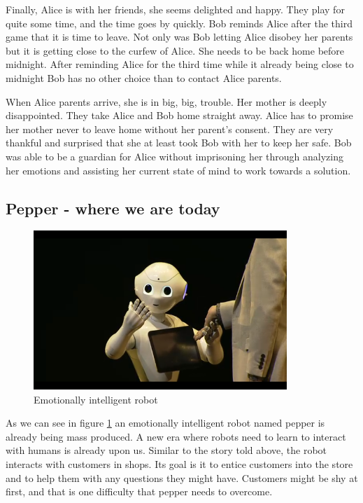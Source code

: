 \documentclass{lncs}
\begin{document}
Finally, Alice is with her friends, she seems delighted and happy. They play for quite some time, and the time goes by quickly. Bob reminds Alice after the third game that it is time to leave. Not only was Bob letting Alice disobey her parents but it is getting close to the curfew of Alice. She needs to be back home before midnight. After reminding Alice for the third time while it already being close to midnight Bob has no other choice than to contact Alice parents.

When Alice parents arrive, she is in big, big, trouble. Her mother is deeply disappointed. They take Alice and Bob home straight away. Alice has to promise her mother never to leave home without her parent's consent. They are very thankful and surprised that she at least took Bob with her to keep her safe. Bob was able to be a guardian for Alice without imprisoning her through analyzing her emotions and assisting her current state of mind to work towards a solution.

\subsection{Pepper - where we are today}

\begin{figure}%
\includegraphics[width=\linewidth, height=6cm]{pepper.png}
\caption{Emotionally intelligent robot \cite{pepper}}
\label{fig:pepper}
\end{figure}

As we can see in figure \ref{fig:pepper} an emotionally intelligent robot named pepper is already being mass produced. A new era where robots need to learn to interact with humans is already upon us. Similar to the story told above, the robot interacts with customers in shops. Its goal is it to entice customers into the store and to help them with any questions they might have. Customers might be shy at first, and that is one difficulty that pepper needs to overcome. 
\end{document}
